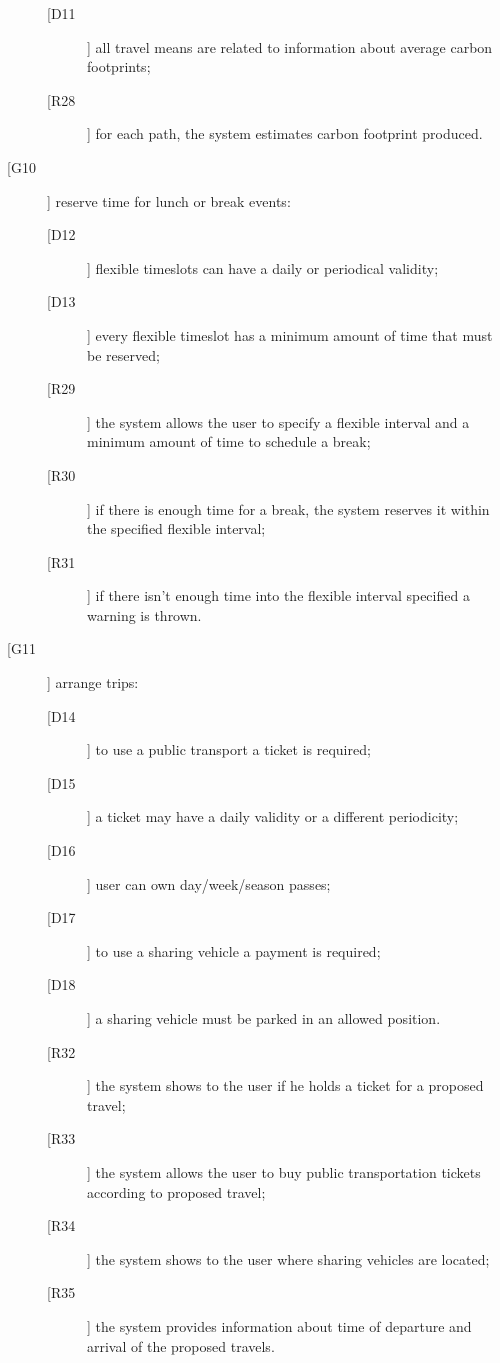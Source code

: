 \begin{description}
	\begin{description}
	\item[[D11]] all travel means are related to information about average carbon footprints; 
	\newline
	\item[[R28]] for each path, the system estimates carbon footprint produced.
	\end{description}
\item[[G10]] reserve time for lunch or break events:
	\begin{description}
	\item[[D12]] flexible timeslots can have a daily or periodical validity;
	\item[[D13]] every flexible timeslot has a minimum amount of time that must be reserved;
	\newline
	\item[[R29]] the system allows the user to specify a flexible interval and a minimum amount of time to schedule a break;
	\item[[R30]] if there is enough time for a break, the system reserves it within the specified flexible interval;
	\item[[R31]] if there isn’t enough time into the flexible interval specified a warning is thrown.
	\end{description}
\item[[G11]] arrange trips:
	\begin{description}
	\item[[D14]] to use a public transport a ticket is required; 
	\item[[D15]] a ticket may have a daily validity or a different periodicity; 
	\item[[D16]] user can own day/week/season passes;
	\item[[D17]] to use a sharing vehicle a payment is required;
	\item[[D18]] a sharing vehicle must be parked in an allowed position.
	\newline
	\item[[R32]] the system shows to the user if he holds a ticket for a proposed travel;
	\item[[R33]] the system allows the user to buy public transportation tickets according to proposed travel;
	\item[[R34]] the system shows to the user where sharing vehicles are located;
	\item[[R35]] the system provides information about time of departure and arrival of the proposed travels.
	\end{description}
\end{description}